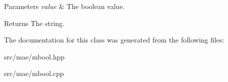 \begin{DoxyParams}{Parameters}
{\em value} & The boolean value. \\
\hline
\end{DoxyParams}
\begin{DoxyReturn}{Returns}
The string. 
\end{DoxyReturn}


The documentation for this class was generated from the following files\-:\begin{DoxyCompactItemize}
\item 
src/mae/mbool.\-hpp\item 
src/mae/mbool.\-cpp\end{DoxyCompactItemize}
